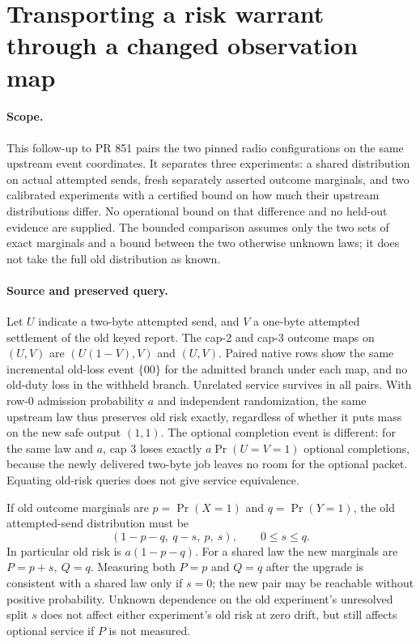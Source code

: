 \documentclass{article}
\begin{document}
\section*{Transporting a risk warrant through a changed observation map}
\paragraph{Scope.}
This follow-up to PR 851 pairs the two pinned radio configurations on the
same upstream event coordinates. It separates three experiments:
a shared distribution on actual attempted sends, fresh separately asserted
outcome marginals, and two calibrated experiments with a certified bound on
how much their upstream distributions differ. No operational bound on that
difference and no held-out evidence are supplied. The bounded comparison
assumes only the two sets of exact marginals and a bound between the two
otherwise unknown laws; it does not take the full old distribution as known.

\paragraph{Source and preserved query.}
Let $U$ indicate a two-byte attempted send, and $V$ a one-byte attempted
settlement of the old keyed report. The cap-2 and cap-3 outcome maps on
$(U,V)$ are $(U(1-V),V)$ and $(U,V)$. Paired native rows show the same
incremental old-loss event $\{00\}$ for the admitted branch under each
map, and no old-duty loss in the withheld branch. Unrelated service
survives in all pairs. With row-0 admission probability $a$ and independent
randomization, the same upstream law thus preserves old risk exactly,
regardless of whether it puts mass on the new safe output $(1,1)$.
The optional completion event is different: for the same law and $a$,
cap 3 loses exactly $a\Pr(U=V=1)$ optional completions, because the newly
delivered two-byte job leaves no room for the optional packet.
Equating old-risk queries does not give service equivalence.

If old outcome marginals are $p=\Pr(X=1)$ and $q=\Pr(Y=1)$, the old
attempted-send distribution must be
\[
   (1-p-q,\ q-s,\ p,\ s),\qquad 0\le s\le q.
\]
In particular old risk is $a(1-p-q)$. For a shared law the new marginals
are $P=p+s,\ Q=q$. Measuring both $P=p$ and $Q=q$ after the upgrade is
consistent with a shared law only if $s=0$; the new pair may be reachable
without positive probability. Unknown dependence on the old experiment's
unresolved split $s$ does not affect either experiment's old risk at zero
drift, but still affects optional service if $P$ is not measured.
\end{document}
